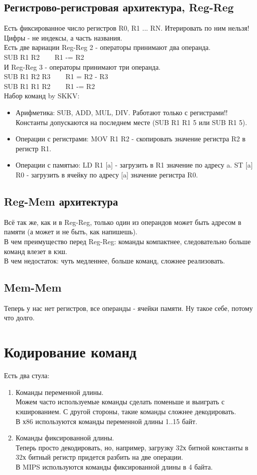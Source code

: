 \documentclass[12pt, a4paper]{article}
\begin{document}
\subsection{Регистрово-регистровая архитектура, Reg-Reg}
Есть фиксированное число регистров R0, R1 ... RN. Итерировать по ним нельзя! Цифры - не индексы, а часть названия.\\
Есть две вариации Reg-Reg 2 - операторы принимают два операнда.\\
SUB R1 R2 ~~~ R1 -= R2\\
И Reg-Reg 3 - операторы принимают три операнда.\\
SUB R1 R2 R3 ~~~ R1 = R2 - R3\\
SUB R1 R1 R2 ~~~ R1 -= R2\\
Набор команд by SKKV:
\begin{itemize}
    \item Арифметика: SUB, ADD, MUL, DIV. Работают только с регистрами!! Константы допускаются на последнем месте (SUB R1 R1 5 или SUB R1 5).
    \item Операции с регистрами: MOV R1 R2 - скопировать значение регистра R2 в регистр R1.
    \item Операции с памятью: LD R1 [a] - загрузить в R1 значение по адресу a. ST [a] R0 - загрузить в ячейку по адресу [a] значение регистра R0.
\end{itemize}
\subsection{Reg-Mem архитектура}
Всё так же, как и в Reg-Reg, только один из операндов может быть адресом в памяти (а может и не быть, как напишешь).\\
В чем преимущество перед Reg-Reg: команды компактнее, следовательно больше команд влезет в кэш.\\
В чем недостаток: чуть медленнее, больше команд, сложнее реализовать.
\subsection{Mem-Mem}
Теперь у нас нет регистров, все операнды - ячейки памяти. Ну такое себе, потому что долго.
\section{Кодирование команд}
Есть два стула:
\begin{enumerate}
    \item Команды переменной длины.\\
    Можем часто используемые команды сделать поменьше и выиграть с кэшированием. С другой стороны, такие команды сложнее декодировать.\\
    В х86 используются команды переменной длины 1..15 байт.
    \item Команды фиксированной длины.\\
    Теперь просто декодировать, но, например, загрузку 32х битной константы в 32х битный регистр придется разбить на две операции.\\
    В MIPS используются команды фиксированной длины в 4 байта.
\end{enumerate}
\end{document}
